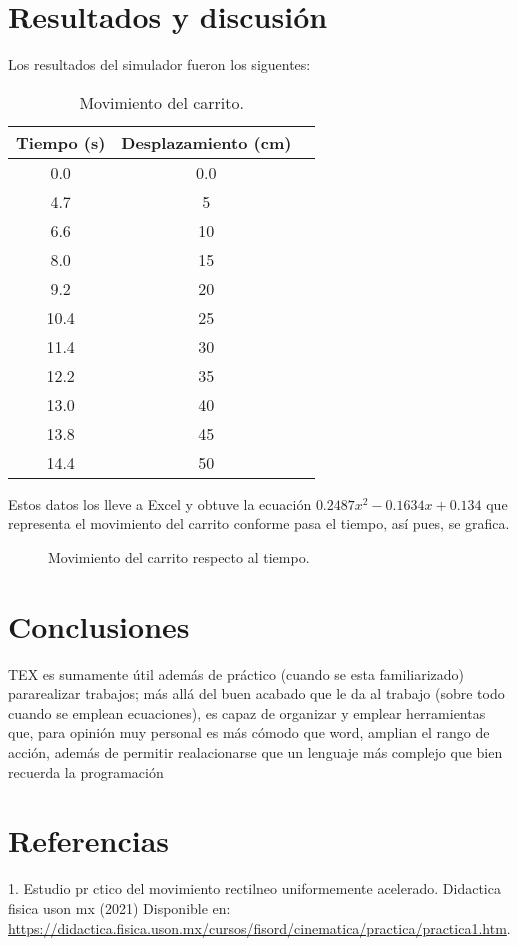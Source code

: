 \documentclass[12pt]{article}
\begin{document}
\section{Resultados y discusión}
Los resultados del simulador fueron los siguentes:  
\begin{table}[H]
\centering
\begin{tabular}{ |c| c |c | }
\hline
 Tiempo (s) & Desplazamiento (cm) \\ 
 \hline
0.0 & 0.0  \\
4.7 & 5  \\  
6.6 & 10 \\
8.0 & 15 \\
9.2 & 20  \\
10.4 & 25  \\  
11.4 & 30 \\
12.2 & 35 \\
13.0 & 40  \\
13.8 & 45 \\
14.4 & 50  \\
\hline    
\end{tabular}
\caption{Movimiento del carrito.}
\label{tab:1}
\end{table}
Estos datos los lleve a Excel y obtuve la ecuación $0.2487x^{2}-0.1634x+0.134$ que representa el movimiento del carrito conforme pasa el tiempo, así pues, se grafica.\\
\begin{center}
\begin{figure}[H]
\begin{center}
\caption{Movimiento del carrito respecto al tiempo.}
\label{fig:1}
\end{center}
\end{figure}
\end{center}
\section{Conclusiones}
TEX es sumamente útil además de práctico (cuando se esta familiarizado) pararealizar trabajos; más allá del buen acabado que le da al trabajo (sobre todo cuando se emplean ecuaciones), es capaz de organizar y emplear herramientas que, para opinión muy personal es más cómodo que word, amplian el rango de acción, además de permitir realacionarse que un lenguaje más complejo que bien recuerda la programación \\

\section{Referencias}
1. Estudio pr ctico del movimiento rectilneo uniformemente acelerado. Didactica fisica uson mx (2021) Disponible en: \url{https://didactica.fisica.uson.mx/cursos/fisord/cinematica/practica/practica1.htm}.
\end{document}
